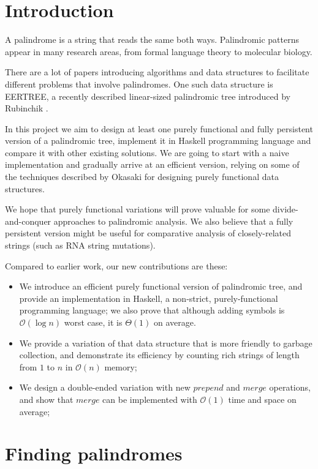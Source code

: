 \section{Introduction}

A palindrome is a string that reads the same both ways.
Palindromic patterns appear in many research areas, from
formal language theory to molecular biology.

There are a lot of papers introducing algorithms and data structures
to facilitate different problems that involve palindromes.
One such data structure is EERTREE, a recently described
linear-sized palindromic tree introduced by Rubinchik \cite{RUBINCHIK2018249}.

In this project we aim to design at least one purely functional and
fully persistent version of a palindromic tree, implement it
in Haskell programming language and compare it
with other existing solutions. We are going to start with
a naive implementation and gradually arrive at an efficient
version, relying on some of the techniques described by
Okasaki \cite{Okasaki1998} for designing purely functional data structures.

We hope that purely functional variations will prove valuable
for some divide-and-conquer approaches to palindromic analysis.
We also believe that a fully persistent version might be useful
for comparative analysis of closely-related strings
(such as RNA string mutations).

Compared to earlier work, our new contributions are these:

\begin{itemize}
\item We introduce an efficient purely functional version of palindromic tree,
  and provide an implementation in Haskell, a non-strict, purely-functional
  programming language; we also prove that although adding symbols is $\mathcal{O}(\log{}n)$ worst case, it is $\Theta(1)$ on average.
\item We provide a variation of that data structure that is more
  friendly to garbage collection, and demonstrate its efficiency
  by counting rich strings of length from $1$ to $n$ in $\mathcal{O}(n)$ memory;
\item We design a double-ended variation with new $prepend$
  and $merge$ operations, and show that $merge$ can be implemented
  with $\mathcal{O}(1)$ time and space on average;
\end{itemize}

\section{Finding palindromes}

